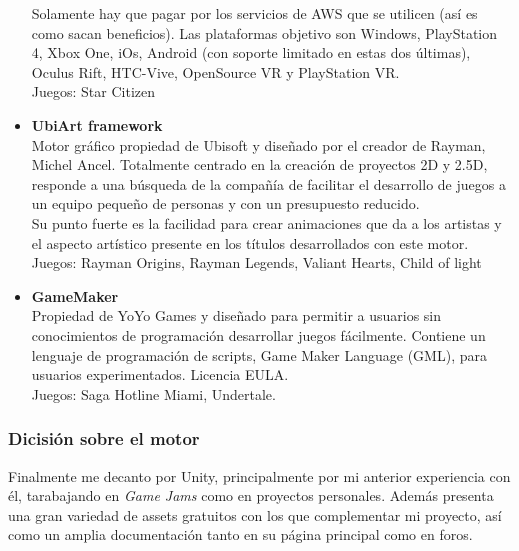 \begin{itemize}
\quad Solamente hay que pagar por los servicios de AWS que se utilicen (así es como sacan beneficios). Las plataformas objetivo son Windows, PlayStation 4, Xbox One, iOs, Android (con soporte limitado en estas dos últimas), Oculus Rift, HTC-Vive, OpenSource VR y PlayStation VR.\\

\quad Juegos: Star Citizen\\

\item{\textbf{UbiArt framework}}\\

\quad Motor gráfico propiedad de Ubisoft y diseñado por el creador de Rayman, Michel Ancel. Totalmente centrado en la creación de proyectos 2D y 2.5D, responde a una
búsqueda de la compañía de facilitar el desarrollo de juegos a un equipo pequeño de personas y con un presupuesto reducido.\\

\quad Su punto fuerte es la facilidad para crear animaciones que da a los artistas y el aspecto artístico presente en los títulos desarrollados con este motor.\\

\quad Juegos: Rayman Origins, Rayman Legends, Valiant Hearts, Child of light \\

\item{\textbf{GameMaker}}\\

\quad Propiedad de YoYo Games y diseñado para permitir a usuarios sin conocimientos de programación desarrollar juegos fácilmente. Contiene un lenguaje de programación de scripts, Game Maker Language (GML), para usuarios experimentados. Licencia EULA.\\

\quad Juegos: Saga Hotline Miami, Undertale.\\
\end{itemize}

\subsubsection{Dicisión sobre el motor}
\quad Finalmente me decanto por Unity, principalmente por mi anterior experiencia con él, tarabajando en \textit{Game Jams} como en proyectos personales. Además presenta una gran variedad de assets gratuitos con los que complementar mi proyecto, así como un amplia documentación tanto en su página principal como en foros.

